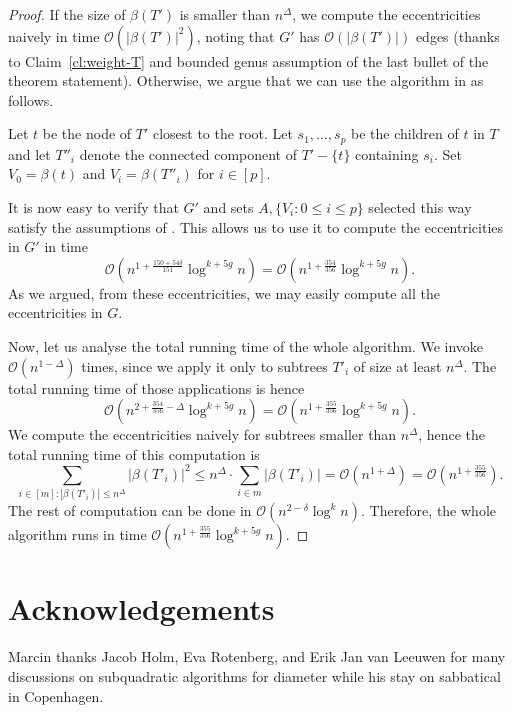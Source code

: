 \documentclass[11pt,a4paper]{article}
\newcommand{\Oh}{\mathcal{O}}
\renewcommand{\leq}{\leqslant}
\begin{document}
\begin{proof}
If the size of $\beta(T')$ is smaller than $n^\Delta$, we compute the eccentricities naively in time $\Oh(|\beta(T')|^2)$, 
noting that $G'$ has $\Oh(|\beta(T')|)$ edges (thanks to Claim~\ref{cl:weight-T} and bounded genus assumption 
of the last bullet of the theorem statement). Otherwise, we argue that we can use the algorithm in  as follows.

Let $t$ be the node of $T'$ closest to the root. Let $s_1, \dots, s_p$ be the children of $t$ in $T$ and let $T''_i$ denote the connected component of $T' - \{t\}$ containing $s_i$. Set $V_0 = \beta(t)$ and $V_i = \beta(T''_i)$ for $i \in [p]$.

It is now easy to verify that $G'$ and sets $A, \{V_i\colon 0\leq i\leq p\}$ selected this way satisfy the assumptions of . This allows us to use it to compute the eccentricities in $G'$ in time
$$
\Oh \left( n^{1 + \frac{150 + 54\delta}{151}} \log^{k + 5g} n \right) =
\Oh \left( n^{1 + \frac{354}{356}} \log^{k + 5g} n \right).
$$
As we argued, from these eccentricities, we may easily compute all the eccentricities in $G$.

Now, let us analyse the total running time of the whole algorithm. We invoke  $\Oh(n^{1 - \Delta})$ times, since we apply it only to subtrees $T'_i$ of size at least $n^\Delta$. The total running time of those applications is hence
$$
\Oh \left( n^{2 + \frac{354}{356} - \Delta} \log^{k + 5g} n \right) =
\Oh \left( n^{1 + \frac{355}{356}} \log^{k + 5g} n \right).
$$
We compute the eccentricities naively for subtrees smaller than $n^\Delta$, hence the total running time of this computation is
$$
\sum_{i \in [m] \colon |\beta(T'_i)| \leq n^\Delta} |\beta(T'_i)|^2 \leq
n^\Delta \cdot \sum_{i \in m} |\beta(T'_i)| = \Oh(n^{1 + \Delta})=\Oh\left(n^{1+\frac{355}{356}}\right).
$$
The rest of computation can be done in $\Oh(n^{2 - \delta} \log^k n)$. Therefore, the whole algorithm runs in time $\Oh \left( n^{1 + \frac{355}{356}} \log^{k + 5g} n \right)$.
\end{proof}
 
\section*{Acknowledgements}
Marcin thanks Jacob Holm, Eva Rotenberg, and Erik Jan van Leeuwen
for many discussions on subquadratic algorithms for diameter while his stay on sabbatical
in Copenhagen.
\end{document}
